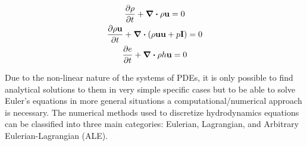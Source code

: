 \begin{subequations}\label{eq:Euler}
\begin{gather}
    \pdv{\rho}{t} + \div{\rho \vb{u}}=0\\
    \pdv{\rho\vb{u}}{t} + \div(\rho \vb{uu} +p\vb{I})=0\\
    \pdv{e}{t} + \div{\rho h\vb{u}}=0
\end{gather}
\end{subequations}

Due to the non-linear nature of the systems of PDEs, it is only possible to find analytical solutions to them in very simple specific cases but to be able to solve Euler's equations in more general situations a computational/numerical approach is necessary. The numerical methods used to discretize hydrodynamics equations can be 
classified into three main categories: Eulerian, Lagrangian, and Arbitrary Eulerian-Lagrangian (ALE). 


